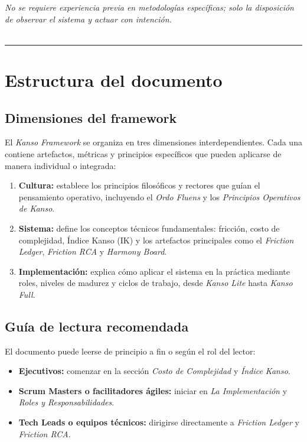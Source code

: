 \textit{No se requiere experiencia previa en metodologías específicas; solo la disposición de observar el sistema y actuar con intención.}
\\
\\
\hrule
\section{Estructura del documento}

\subsection*{Dimensiones del framework}
El \textit{Kanso Framework} se organiza en tres dimensiones interdependientes. Cada una contiene artefactos, métricas y principios específicos que pueden aplicarse de manera individual o integrada:

\begin{enumerate}
    \item \textbf{Cultura:} establece los principios filosóficos y rectores que guían el pensamiento operativo, incluyendo el \textit{Ordo Fluens} y los \textit{Principios Operativos de Kanso}.
    \item \textbf{Sistema:} define los conceptos técnicos fundamentales: fricción, costo de complejidad, Índice Kanso (IK) y los artefactos principales como el \textit{Friction Ledger}, \textit{Friction RCA} y \textit{Harmony Board}.
    \item \textbf{Implementación:} explica cómo aplicar el sistema en la práctica mediante roles, niveles de madurez y ciclos de trabajo, desde \textit{Kanso Lite} hasta \textit{Kanso Full}.
\end{enumerate}

\subsection*{Guía de lectura recomendada}
El documento puede leerse de principio a fin o según el rol del lector:

\begin{itemize}
    \item \textbf{Ejecutivos:} comenzar en la sección \textit{Costo de Complejidad} y \textit{Índice Kanso}.
    \item \textbf{Scrum Masters o facilitadores ágiles:} iniciar en \textit{La Implementación} y \textit{Roles y Responsabilidades}.
    \item \textbf{Tech Leads o equipos técnicos:} dirigirse directamente a \textit{Friction Ledger} y \textit{Friction RCA}.
\end{itemize}

